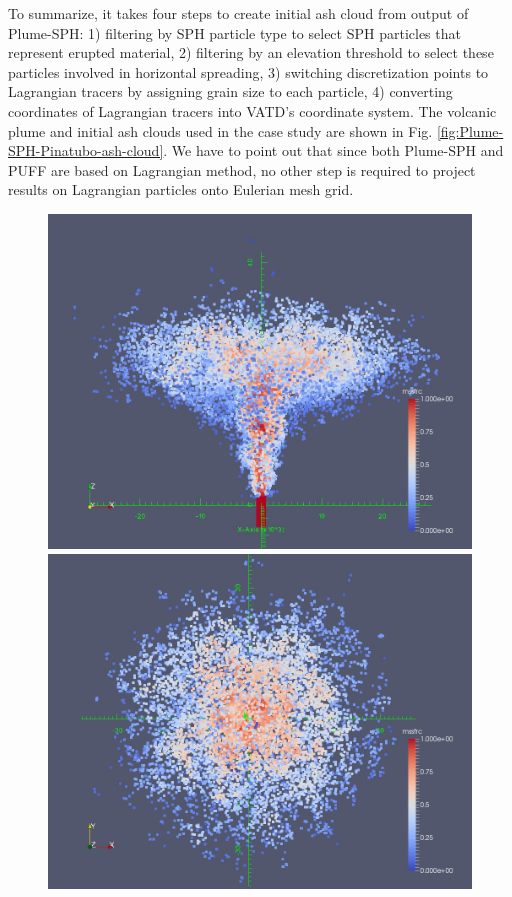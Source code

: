 To summarize, it takes four steps to create initial ash cloud from output of Plume-SPH: 1) filtering by SPH particle type to select SPH particles that represent erupted material, 2) filtering by an elevation threshold to select these particles involved in horizontal spreading, 3) switching discretization points to Lagrangian tracers by assigning grain size to each particle, 4) converting coordinates of Lagrangian tracers into VATD's coordinate system. The volcanic plume and initial ash clouds used in the case study are shown in Fig. \ref{fig:Plume-SPH-Pinatubo-ash-cloud}. We have to point out that since both Plume-SPH and PUFF are based on Lagrangian method, no other step is required to project results on Lagrangian particles onto Eulerian mesh grid.

\begin{figure}[!htb]
    \centering
    \begin{minipage}{.325\textwidth}
        \centering
        \includegraphics[width=0.99 \textwidth]{Chapter-7/Figures/mssfrc_front-filter-by-phase}
    \end{minipage}%
    \begin{minipage}{.325 \textwidth}
        \centering
        \includegraphics[width=0.99 \textwidth]{Chapter-7/Figures/mssfrc_top-with-axis}

\end{minipage}
\end{figure}
